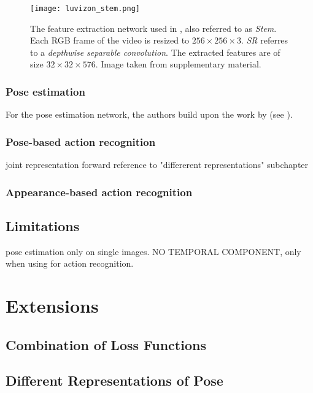 \begin{figure}[htb!]
    \centering
    \texttt{[image: luvizon\_stem.png]}
    \caption{The feature extraction network used in \cite{luvizon_2d/3d_2018}, also referred to as \textit{Stem}. Each RGB frame of the video is resized to $256 \times 256 \times 3$. \textit{SR} referres to a \textit{depthwise separable convolution}. The extracted features are of size $32 \times 32 \times 576$. Image taken from \cite{luvizon_2d/3d_2018} supplementary material.}
    \label{fig:luvizon_stem}
\end{figure}

\subsubsection{Pose estimation}
For the pose estimation network, the authors build upon the work by \cite{newell_stacked_2016} (see ).


\subsubsection{Pose-based action recognition}
joint representation
forward reference to "differerent representations" subchapter

\subsubsection{Appearance-based action recognition}

\subsection{Limitations}
pose estimation only on single images. NO TEMPORAL COMPONENT, only when using for action recognition.

\section{Extensions}

\subsection{Combination of Loss Functions}

\subsection{Different Representations of Pose}
